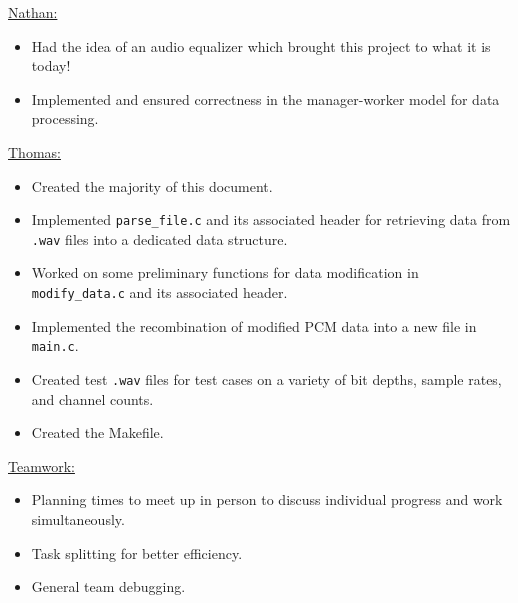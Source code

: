 \documentclass{article}
\begin{document}
\underline{Nathan:}

\begin{itemize}
    \item Had the idea of an audio equalizer which brought this project to what it is today!
    \item Implemented and ensured correctness in the manager-worker model for data processing. 
\end{itemize}

\underline{Thomas:}
\begin{itemize}
    \item Created the majority of this document.
    \item Implemented \texttt{parse\_file.c} and its associated header for retrieving data from \texttt{.wav} files into a dedicated data structure.
    \item Worked on some preliminary functions for data modification in \texttt{modify\_data.c} and its associated header.
    \item Implemented the recombination of modified PCM data into a new file in \texttt{main.c}.
    \item Created test \texttt{.wav} files for test cases on a variety of bit depths, sample rates, and channel counts.
    \item Created the Makefile.
\end{itemize}

\underline{Teamwork:}
\begin{itemize}
    \item Planning times to meet up in person to discuss individual progress and work simultaneously.
    \item Task splitting for better efficiency.
    \item General team debugging.
\end{itemize}
\end{document}
